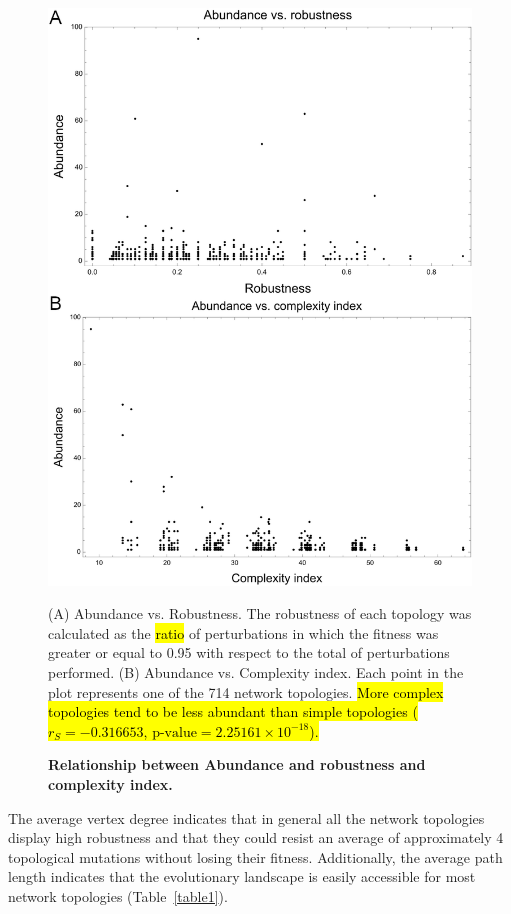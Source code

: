 \documentclass[10pt,letterpaper]{article}
\newcommand{\hil}[1]{\hl{#1}} %
\begin{document}
\begin{figure}[!h]
 \includegraphics[width=\textwidth]{figures/results/Fig6}
 \caption{\bf Relationship between Abundance and robustness and complexity
 index.} (A) Abundance vs. Robustness. The robustness of each topology was
 calculated as the \hil{ratio} of perturbations in which the fitness was greater or
 equal to 0.95 with respect to the total of perturbations performed.
 (B) Abundance vs. Complexity index. Each point in the plot represents one of
 the 714 network topologies. \hil{More complex topologies tend to be less abundant
 than simple topologies
 ($r_S = -0.316653$, $\text{p-value} = 2.25161\times10^{-18}$).}
 \label{fig:ab-rob}
\end{figure}

The average vertex degree indicates that in general all the network topologies
display high robustness and that they could resist an average of approximately 4
topological mutations without losing their fitness. Additionally, the average
path length indicates that the evolutionary landscape is easily accessible for
most network topologies (Table~\ref{table1}).
\end{document}
